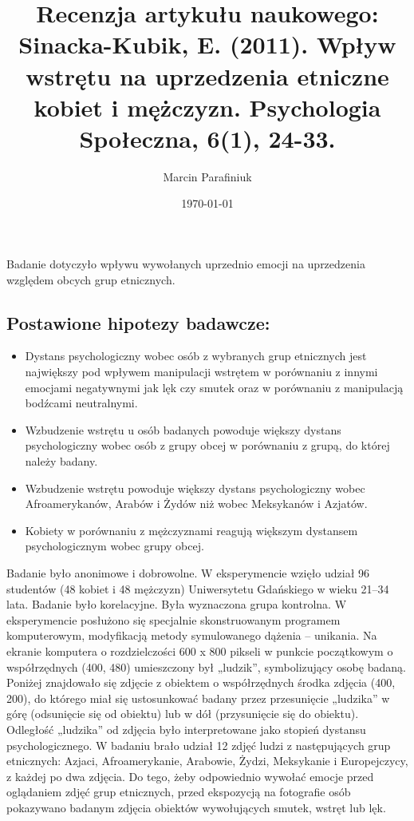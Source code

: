 \documentclass{psychol}
\title{Recenzja artykułu naukowego: Sinacka-Kubik, E. (2011). Wpływ wstrętu na uprzedzenia etniczne kobiet i mężczyzn. Psychologia Społeczna, 6(1), 24-33.}
\author{Marcin Parafiniuk}
\date{\today}
\begin{document}
\maketitle
\doublespacing

\pagebreak


Badanie dotyczyło wpływu wywołanych uprzednio emocji na uprzedzenia względem obcych grup etnicznych.

\subsection{Postawione hipotezy badawcze:}
\begin{itemize}
    \item Dystans psychologiczny wobec osób z wybranych grup etnicznych jest największy pod wpływem manipulacji wstrętem w porównaniu z innymi emocjami negatywnymi jak lęk czy smutek oraz w porównaniu z manipulacją bodźcami neutralnymi.
    \item Wzbudzenie wstrętu u osób badanych powoduje większy dystans psychologiczny wobec osób z grupy obcej w porównaniu z grupą, do której należy badany.
    \item Wzbudzenie wstrętu powoduje większy dystans psychologiczny wobec Afroamerykanów, Arabów i Żydów niż wobec Meksykanów i Azjatów.
    \item Kobiety w porównaniu z mężczyznami reagują większym dystansem psychologicznym wobec grupy obcej.
\end{itemize}

\costam[23456][yyyyyy]

Badanie było anonimowe i dobrowolne. W  eksperymencie wzięło udział 96 studentów (48 kobiet i 48 mężczyzn) Uniwersytetu Gdańskiego w wieku 21–34 lata. Badanie było korelacyjne. Była wyznaczona grupa kontrolna. W eksperymencie posłużono się specjalnie skonstruowanym programem komputerowym, modyfikacją metody symulowanego dążenia – unikania. Na ekranie komputera o rozdzielczości 600 x 800 pikseli w punkcie początkowym o współrzędnych (400, 480)
umieszczony był „ludzik”, symbolizujący osobę badaną.
Poniżej znajdowało się zdjęcie z obiektem o współrzędnych środka zdjęcia (400, 200), do którego miał się ustosunkować badany przez przesunięcie „ludzika” w górę
(odsunięcie się od obiektu) lub w dół (przysunięcie się
do obiektu). Odległość „ludzika” od zdjęcia było interpretowane jako stopień dystansu psychologicznego. W badaniu brało udział 12 zdjęć ludzi z następujących grup etnicznych: Azjaci, Afroamerykanie, Arabowie,
Żydzi, Meksykanie i Europejczycy, z każdej po dwa zdjęcia. Do tego, żeby odpowiednio wywołać emocje przed oglądaniem zdjęć grup etnicznych, przed ekspozycją na fotografie osób pokazywano badanym zdjęcia obiektów wywołujących smutek, wstręt lub lęk.
\end{document}
